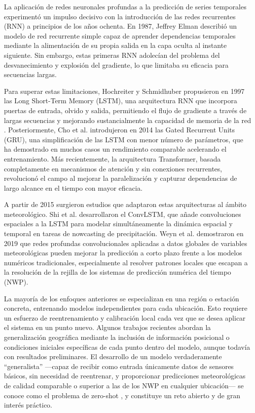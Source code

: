 La aplicación de redes neuronales profundas a la predicción de series temporales experimentó un impulso decisivo con la introducción de las redes recurrentes (RNN)
a principios de los años ochenta. En 1987, Jeffrey Elman describió un modelo de red recurrente simple capaz de aprender dependencias temporales mediante la alimentación
de su propia salida en la capa oculta al instante siguiente\cite{elman1990}. Sin embargo, estas primeras RNN adolecían del problema del desvanecimiento y explosión del gradiente, lo
que limitaba su eficacia para secuencias largas.

Para superar estas limitaciones, Hochreiter y Schmidhuber propusieron en 1997 las Long Short-Term Memory (LSTM), una arquitectura RNN que incorpora puertas de entrada,
olvido y salida, permitiendo el flujo de gradiente a través de largas secuencias y mejorando sustancialmente la capacidad de memoria de la red \cite{hochreiter1997}.
Posteriormente, Cho et al. introdujeron en 2014 las Gated Recurrent Units (GRU), una simplificación de las LSTM con menor número de parámetros,
que ha demostrado en muchos casos un rendimiento comparable acelerando el entrenamiento\cite{cho2014}. 
Más recientemente, la arquitectura Transformer, basada completamente en mecanismos de atención y sin conexiones recurrentes, revolucionó el campo al
mejorar la paralelización y capturar dependencias de largo alcance en el tiempo con mayor eficacia\cite{vaswani2017}.

A partir de 2015 surgieron estudios que adaptaron estas arquitecturas al ámbito meteorológico. Shi et al. desarrollaron el ConvLSTM, que añade convoluciones espaciales a
la LSTM para modelar simultáneamente la dinámica espacial y temporal en tareas de nowcasting de precipitación\cite{shi2015}. Weyn et al. demostraron en 2019 que redes
profundas convolucionales aplicadas a datos globales de variables meteorológicas pueden mejorar la predicción a corto plazo frente a los modelos numéricos tradicionales,
especialmente al resolver patrones locales que escapan a la resolución de la rejilla de los sistemas de predicción numérica del tiempo (NWP)\cite{weyn2019}.

La mayoría de los enfoques anteriores se especializan en una región o estación concreta, entrenando modelos independientes para cada ubicación. Esto requiere un esfuerzo de
reentrenamiento y calibración local cada vez que se desea aplicar el sistema en un punto nuevo. Algunos trabajos recientes abordan la generalización geográfica mediante la
 inclusión de información posicional o condiciones iniciales específicas de cada punto dentro del modelo, aunque todavía con resultados preliminares\cite{fu2019}. 
El desarrollo de un modelo verdaderamente “generalista” —capaz de recibir como entrada únicamente datos de sensores básicos, sin necesidad de reentrenar, y proporcionar predicciones meteorológicas
de calidad comparable o superior a las de los NWP en cualquier ubicación— se conoce como el problema de zero-shot \cite{deznabi2024}, 
y constituye un reto abierto y de gran interés práctico.

